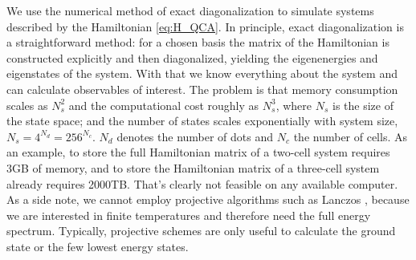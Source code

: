 We use the numerical method of exact diagonalization \cite{Fehske} to simulate
 systems described by the Hamiltonian \eqref{eq:H_QCA}. In principle,
exact diagonalization is a straightforward method: for a chosen basis the matrix
of the Hamiltonian is constructed explicitly and then diagonalized, yielding the
eigenenergies and eigenstates of the system. With that we know everything about
the system and can calculate observables of interest. The problem is that memory
consumption scales as $N_s^2$ and the computational cost roughly as $N_s^3$,
where $N_s$ is the size of the state space; and the number of states scales
exponentially with system size, $N_s = 4^{N_d} = 256^{N_c}$. $N_d$ denotes the
number of dots and $N_c$ the number of cells. As an example, to store the full
Hamiltonian matrix of a two-cell  system requires 3GB of memory, and
to store the Hamiltonian matrix of a three-cell system already requires 2000TB.
That's clearly not feasible on any available computer. As a side note, we cannot
employ projective algorithms such as Lanczos \cite{Fehske}, because we are
interested in finite temperatures and therefore need the full energy spectrum.
Typically, projective schemes are only useful to calculate the ground state or
the few lowest energy states. 

